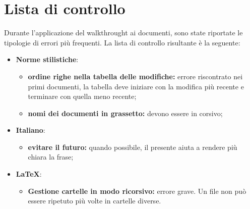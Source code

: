\chapter{Lista di controllo}
Durante l'applicazione del walkthrought ai documenti, sono state riportate le tipologie di errori più frequenti. La lista di controllo risultante è la seguente:
\begin{itemize}
	\item \textbf{Norme stilistiche}:
	\begin{itemize}
		\item \textbf{ordine righe nella tabella delle modifiche:} errore riscontrato nei primi documenti, la tabella deve iniziare con la modifica più recente e terminare con quella meno recente;
		\item \textbf{nomi dei documenti in grassetto:} devono essere in corsivo;
	\end{itemize}
	\item \textbf{Italiano}:
	\begin{itemize}
		\item \textbf{evitare il futuro:} quando possibile, il presente aiuta a rendere più chiara la frase;
	\end{itemize}
	\item \textbf{\LaTeX}:
	\begin{itemize}
		\item \textbf{Gestione cartelle in modo ricorsivo:} errore grave. Un file non può essere ripetuto più volte in cartelle diverse.
	\end{itemize}
\end{itemize}